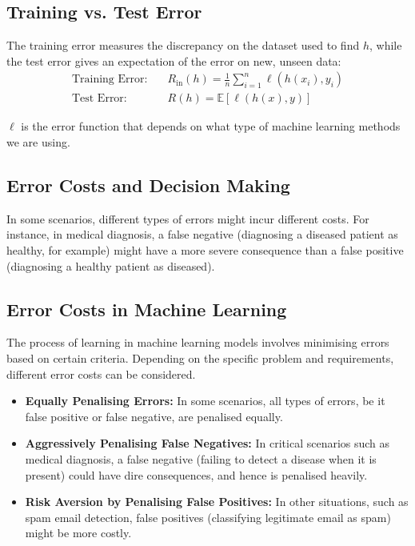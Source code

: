 \subsection{Training vs. Test Error}
The training error measures the discrepancy on the dataset used to find \( h \), while the test error gives an expectation of the error on new, unseen data:
\begin{align*}
    \text{Training Error:} \quad & R_{\text{in}}(h) = \frac{1}{n} \sum_{i=1}^{n} \ell(h(x_i), y_i) \\
    \text{Test Error:} \quad & R(h) = \mathbb{E}[\ell(h(x), y)]
\end{align*}

$\ell$ is the error function that depends on what type of machine learning methods we are using.

\subsection{Error Costs and Decision Making}
In some scenarios, different types of errors might incur different costs. For instance, in medical diagnosis, a false negative (diagnosing a diseased patient as healthy, for example) might have a more severe consequence than a false positive (diagnosing a healthy patient as diseased). 

\subsection{Error Costs in Machine Learning}
The process of learning in machine learning models involves minimising errors based on certain criteria. Depending on the specific problem and requirements, different error costs can be considered.

\begin{itemize}
    \item \textbf{Equally Penalising Errors:} In some scenarios, all types of errors, be it false positive or false negative, are penalised equally.
    \item \textbf{Aggressively Penalising False Negatives:} In critical scenarios such as medical diagnosis, a false negative (failing to detect a disease when it is present) could have dire consequences, and hence is penalised heavily.
    \item \textbf{Risk Aversion by Penalising False Positives:} In other situations, such as spam email detection, false positives (classifying legitimate email as spam) might be more costly.
\end{itemize}

